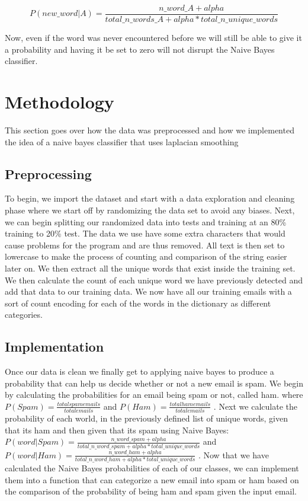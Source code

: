  
 \[P(new\_word|A)= \frac{n\_word\_A + alpha}{total\_n\_words\_A + alpha*total\_n\_unique\_words}\]
 
 
 Now, even if the word was never encountered before we will still be able to give it a probability and having it be set to zero will not disrupt the Naive Bayes classifier.

\section{Methodology}
This section goes over how the data was preprocessed and how we implemented the idea of a naive bayes classifier that uses laplacian smoothing
\subsection{Preprocessing}
To begin, we import the dataset and start with a data exploration and cleaning phase where we start off by randomizing the data set to avoid any biases. Next, we can begin splitting our randomized data into tests and training at an 80\% training to 20\% test. The data we use have some extra characters that would cause problems for the program and are thus removed. All text is then set to lowercase to make the process of counting and comparison of the string easier later on.
We then extract all the unique words that exist inside the training set. We then calculate the count of each unique word we have previously detected and add that data to our training data. We now have all our training emails with a sort of count encoding for each of the words in the dictionary as different categories.


\subsection{Implementation}
Once our data is clean we finally get to applying naive bayes to produce a probability that can help us decide whether or not a new email is spam. We begin by calculating the probabilities for an email being spam or not, called ham. where \( P(Spam) = \frac{total spam emails}{total emails} \) and \( P(Ham) = \frac{total ham emails}{total emails} \) . Next we calculate the probability of each world, in the previously defined list of unique words, given that its ham and then given that its spam using Naive Bayes: \( P(word|Spam) = \frac{n\_word\_spam + alpha }{total\_n\_word\_spam+ alpha*total\_unique\_words} \) and
\( P(word|Ham) = \frac{n\_word\_ham + alpha }{total\_n\_word\_ham + alpha*total\_unique\_words} \) . Now that we have calculated the Naive Bayes probabilities of each of our classes, we can implement them into a function that can categorize a new email into spam or ham based on the comparison of the probability of being ham and spam given the input email.





